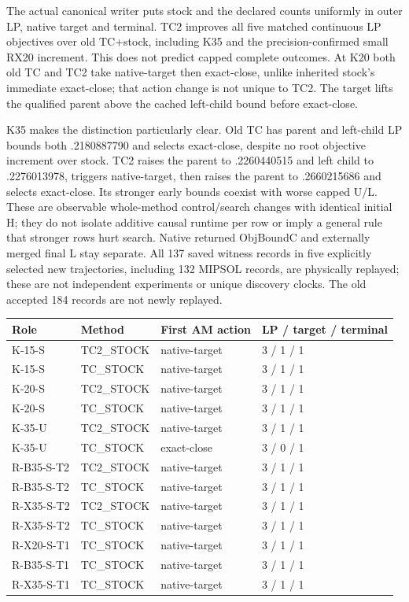 \documentclass[
  american,
  11pt,
]{article}
\newcounter{none} %
\begin{document}
The actual canonical writer puts stock and the declared counts uniformly
in outer LP, native target and terminal. TC2 improves all five matched
continuous LP objectives over old TC+stock, including K35 and the
precision-confirmed small RX20 increment. This does not predict capped
complete outcomes. At K20 both old TC and TC2 take native-target then
exact-close, unlike inherited stock's immediate exact-close; that action
change is not unique to TC2. The target lifts the qualified parent above
the cached left-child bound before exact-close.

K35 makes the distinction particularly clear. Old TC has parent and
left-child LP bounds both .2180887790 and selects exact-close, despite
no root objective increment over stock. TC2 raises the parent to
.2260440515 and left child to .2276013978, triggers native-target, then
raises the parent to .2660215686 and selects exact-close. Its stronger
early bounds coexist with worse capped U/L. These are observable
whole-method control/search changes with identical initial H; they do
not isolate additive causal runtime per row or imply a general rule that
stronger rows hurt search. Native returned ObjBoundC and externally
merged final L stay separate. All 137 saved witness records in five
explicitly selected new trajectories, including 132 MIPSOL records, are
physically replayed; these are not independent experiments or unique
discovery clocks. The old accepted 184 records are not newly replayed.


{\def\LTcaptype{none} %
\begin{longtable}[]{@{}llll@{}}
\toprule\noalign{}
Role & Method & First AM action & LP / target / terminal \\
\midrule\noalign{}
\endhead
\bottomrule\noalign{}
\endlastfoot
K-15-S & TC2\_\allowbreak{}STOCK & native-target & 3 / 1 / 1 \\
K-15-S & TC\_\allowbreak{}STOCK & native-target & 3 / 1 / 1 \\
K-20-S & TC2\_\allowbreak{}STOCK & native-target & 3 / 1 / 1 \\
K-20-S & TC\_\allowbreak{}STOCK & native-target & 3 / 1 / 1 \\
K-35-U & TC2\_\allowbreak{}STOCK & native-target & 3 / 1 / 1 \\
K-35-U & TC\_\allowbreak{}STOCK & exact-close & 3 / 0 / 1 \\
R-B35-S-T2 & TC2\_\allowbreak{}STOCK & native-target & 3 / 1 / 1 \\
R-B35-S-T2 & TC\_\allowbreak{}STOCK & native-target & 3 / 1 / 1 \\
R-X35-S-T2 & TC2\_\allowbreak{}STOCK & native-target & 3 / 1 / 1 \\
R-X35-S-T2 & TC\_\allowbreak{}STOCK & native-target & 3 / 1 / 1 \\
R-X20-S-T1 & TC\_\allowbreak{}STOCK & native-target & 3 / 1 / 1 \\
R-B35-S-T1 & TC\_\allowbreak{}STOCK & native-target & 3 / 1 / 1 \\
R-X35-S-T1 & TC\_\allowbreak{}STOCK & native-target & 3 / 1 / 1 \\
\end{longtable}
}
\end{document}
